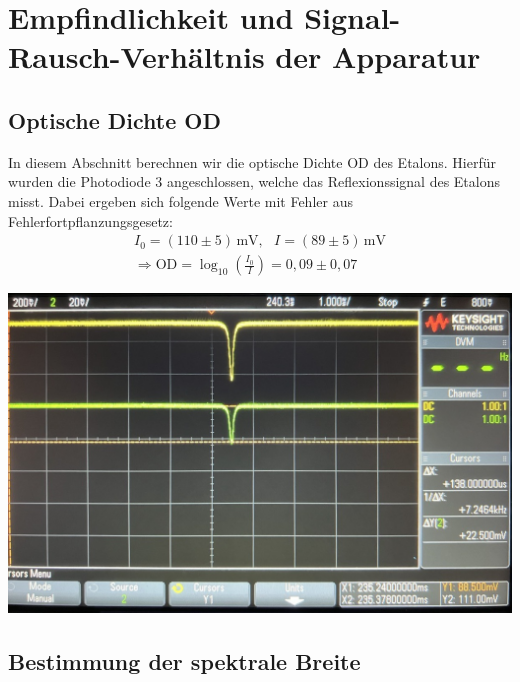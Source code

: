 \newpage

\section{Empfindlichkeit und Signal-Rausch-Verhältnis der Apparatur}
\label{sec:signalRausch}

\subsection{Optische Dichte OD}
\label{sub:opDichte}

In diesem Abschnitt berechnen wir die optische Dichte OD des Etalons. Hierfür wurden die Photodiode 3 angeschlossen, welche das Reflexionssignal des Etalons misst. Dabei ergeben sich folgende Werte mit Fehler aus Fehlerfortpflanzungsgesetz:
\begin{gather}
    I_0 = (110 \pm 5)\,\mathrm{mV}, ~~~I = (89 \pm 5)\,\mathrm{mV}\\[0,5cm]
    \Rightarrow \boxed{\mathrm{OD} = \log_{10}\left(\frac{I_0}{I}\right) = 0,09 \pm 0,07}
\end{gather} 

\begin{center}
    \captionsetup{type=figure}
    \includegraphics[scale=0.2]{Bilder/Signal-Rausch/signal-rausch_od.jpg}
    \label{fig:opDichte}
\end{center}

\subsection{Bestimmung der spektrale Breite}
\label{sub:specBreite}

